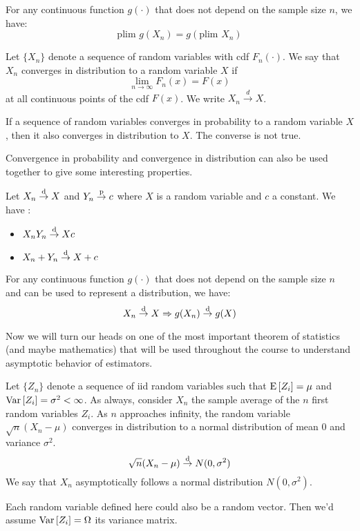 \begin{theorem}
For any continuous function $g(\cdot)$ that does not depend on the sample size $n$, we have: $$\text{plim } g(X_n) = g(\text{plim }X_n)$$
\end{theorem}

\begin{definition}
Let $\{X_n\}$ denote a sequence of random variables with cdf $F_n(\cdot)$. We say that $X_n$ converges in distribution to a random variable $X$ if $$\lim_{n\to\infty} F_n(x) = F(x)$$ at all continuous points of the cdf $F(x)$. We write $X_n \overset{d}{\to} X$.
\end{definition}

\begin{remark}
If a sequence of random variables converges in probability to a random variable $X$, then it also converges in distribution to $X$. The converse is not true.
\end{remark}

Convergence in probability and convergence in distribution can also be used together to give some interesting properties.

\begin{remark}
Let $X_n\overset{\text{d}}{\to} X$ and $Y_n \overset{\text{p}}{\to} c$ where $X$ is a random variable and $c$ a constant. We have : \begin{itemize}
\item $X_nY_n \overset{\text{d}}{\to} Xc$
\item $X_n + Y_n \overset{\text{d}}{\to} X + c$
\end{itemize}
\end{remark}

\begin{theorem}
For any continuous function $g(\cdot)$ that does not depend on the sample size $n$ and can be used to represent a distribution, we have: $$X_n \overset{\text{d}}{\to} X \Rightarrow g(X_n)\overset{\text{d}}{\to} g(X)$$
\end{theorem}

Now we will turn our heads on one of the most important theorem of statistics (and maybe mathematics) that will be used throughout the course to understand asymptotic behavior of estimators.

\begin{theorem}
Let $\{Z_n\}$ denote a sequence of iid random variables such that $\operatorname{E}\left[Z_i\right] = \mu$ and $\operatorname{Var}\left[Z_i\right] = \sigma^2 <\infty$. As always, consider $X_n$ the sample average of the $n$ first random variables $Z_i$. As $n$ approaches infinity, the random variable $\sqrt{n}(X_n - \mu)$ converges in distribution to a normal distribution of mean 0 and variance $\sigma^2$. $$\sqrt{n}(X_n - \mu) \overset{\text{d}}{\to} N(0, \sigma^2) $$ We say that $X_n$ asymptotically follows a normal distribution $N(0, \sigma^2)$.

Each random variable defined here could also be a random vector. Then we'd assume $\operatorname{Var}\left[Z_i\right] = \Omega$ its variance matrix.
\end{theorem}


